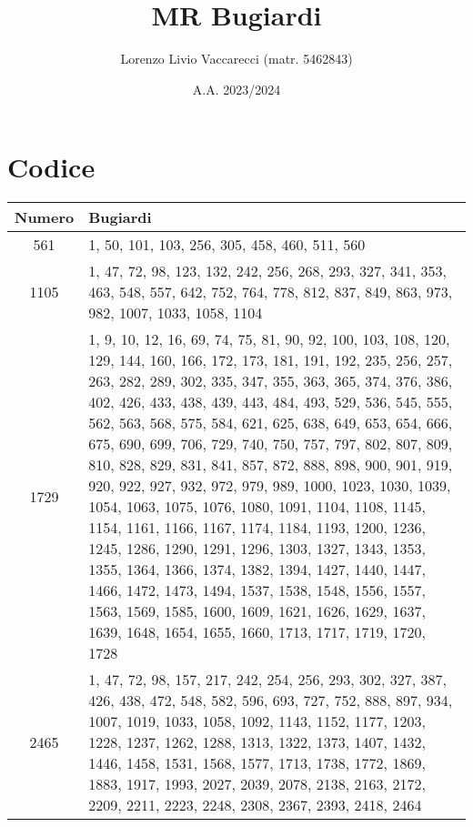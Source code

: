 \documentclass[12pt]{article}
\title{MR Bugiardi}
\author{Lorenzo Livio Vaccarecci (matr. 5462843)}
\date{A.A. 2023/2024}
\begin{document}
\maketitle
\section{Codice}

\begin{tabular}{|c|p{15cm}|}
    \hline
    \textbf{Numero} & \textbf{Bugiardi} \\
    \hline
    561 & \scriptsize{1, 50, 101, 103, 256, 305, 458, 460, 511, 560} \\
    \hline
    1105 & \scriptsize{1, 47, 72, 98, 123, 132, 242, 256, 268, 293, 327, 341, 353, 463, 548, 557, 642, 752, 764, 778, 812, 837, 849, 863, 973, 982, 1007, 1033, 1058, 1104} \\
    \hline
    1729 & \scriptsize{1, 9, 10, 12, 16, 69, 74, 75, 81, 90, 92, 100, 103, 108, 120, 129, 144, 160, 166, 172, 173, 181, 191, 192, 235, 256, 257, 263, 282, 289, 302, 335, 347, 355, 363, 365, 374, 376, 386, 402, 426, 433, 438, 439, 443, 484, 493, 529, 536, 545, 555, 562, 563, 568, 575, 584, 621, 625, 638, 649, 653, 654, 666, 675, 690, 699, 706, 729, 740, 750, 757, 797, 802, 807, 809, 810, 828, 829, 831, 841, 857, 872, 888, 898, 900, 901, 919, 920, 922, 927, 932, 972, 979, 989, 1000, 1023, 1030, 1039, 1054, 1063, 1075, 1076, 1080, 1091, 1104, 1108, 1145, 1154, 1161, 1166, 1167, 1174, 1184, 1193, 1200, 1236, 1245, 1286, 1290, 1291, 1296, 1303, 1327, 1343, 1353, 1355, 1364, 1366, 1374, 1382, 1394, 1427, 1440, 1447, 1466, 1472, 1473, 1494, 1537, 1538, 1548, 1556, 1557, 1563, 1569, 1585, 1600, 1609, 1621, 1626, 1629, 1637, 1639, 1648, 1654, 1655, 1660, 1713, 1717, 1719, 1720, 1728} \\
    \hline
    2465 & \scriptsize{1, 47, 72, 98, 157, 217, 242, 254, 256, 293, 302, 327, 387, 426, 438, 472, 548, 582, 596, 693, 727, 752, 888, 897, 934, 1007, 1019, 1033, 1058, 1092, 1143, 1152, 1177, 1203, 1228, 1237, 1262, 1288, 1313, 1322, 1373, 1407, 1432, 1446, 1458, 1531, 1568, 1577, 1713, 1738, 1772, 1869, 1883, 1917, 1993, 2027, 2039, 2078, 2138, 2163, 2172, 2209, 2211, 2223, 2248, 2308, 2367, 2393, 2418, 2464} \\
    \hline

\end{tabular}
\end{document}
